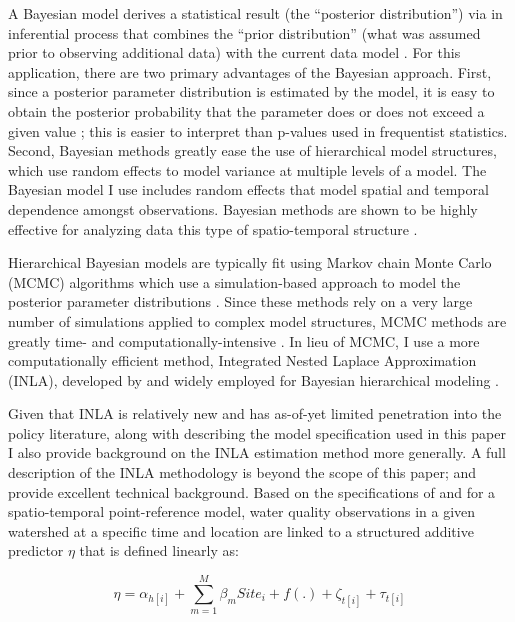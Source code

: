 \documentclass[11pt,a4paper,titlepage]{article}
\begin{document}
A Bayesian model derives a statistical result (the “posterior distribution”) via in inferential process that combines the “prior distribution” (what was assumed prior to observing additional data) with the current data model \parencite{bernardo2009}. For this application, there are two primary advantages of the Bayesian approach. First, since a posterior parameter distribution is estimated by the model, it is easy to obtain the posterior probability that the parameter does or does not exceed a given value \parencite{blangiardo2013}; this is easier to interpret than p-values used in frequentist statistics. Second, Bayesian methods greatly ease the use of hierarchical model structures, which use random effects to model variance at multiple levels of a model. The Bayesian model I use includes random effects that model spatial and temporal dependence amongst observations. Bayesian methods are shown to be highly effective for analyzing data this type of spatio-temporal structure \parencite{dunson2001}. 

Hierarchical Bayesian models are typically fit using Markov chain Monte Carlo (MCMC) algorithms which use a simulation-based approach to model the posterior parameter distributions \parencite{brooks2011,robert2004,lesage2010}. Since these methods rely on a very large number of simulations applied to complex model structures, MCMC methods are greatly time- and computationally-intensive \parencite{blangiardo2013}. In lieu of MCMC, I use a more computationally efficient method, Integrated Nested Laplace Approximation (INLA), developed by \textcite{rue2009} and widely employed for Bayesian hierarchical modeling \parencite{beguin2012,martino2011,martino2010,lindgren2011,cosandey-godin2014}.

Given that INLA is relatively new and has as-of-yet limited penetration into the policy literature, along with describing the model specification used in this paper I also provide background on the INLA estimation method more generally. A full description of the INLA methodology is beyond the scope of this paper; \textcite{rue2014} and \textcite{lindgren2013} provide excellent technical background. Based on the specifications of \textcite{cameletti2013}and \textcite{cosandey-godin2014} for a spatio-temporal point-reference model, water quality observations in a given watershed at a specific time and location are linked to a structured additive predictor $\eta$ that is defined linearly as:

\begin{equation}
\eta = \alpha_{h[i]} + \sum_{m=1}^{M} \beta_{m}Site_{i} + f(.) + \zeta_{t[i]} + \tau_{t[i]}
\label{eq:obslevel}
\end{equation}
\end{document}
